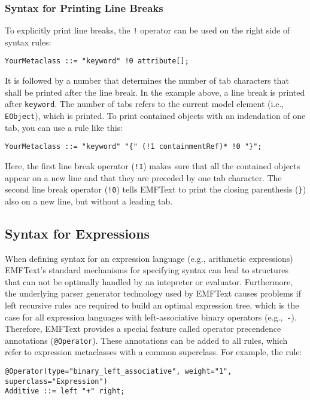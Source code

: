 \subsubsection{Syntax for Printing Line Breaks}

To explicitly print line breaks, the \texttt{!} operator can be used on the
right side of syntax rules:

\begin{lstlisting}
YourMetaclass ::= "keyword" !0 attribute[];
\end{lstlisting}

It is followed by a number that determines the number of tab characters that
shall be printed after the line break. In the example above, a line break
is printed after \texttt{keyword}. The number of tabs refers to the current
model element (i.e., \texttt{EObject}), which is printed. To print contained
objects with an indendation of one tab, you can use a rule like this:

\begin{lstlisting}
YourMetaclass ::= "keyword" "{" (!1 containmentRef)* !0 "}";
\end{lstlisting}

Here, the first line break operator (\texttt{!1}) makes sure that all the
contained objects appear on a new line and that they are preceded by one tab
character. The second line break operator (\texttt{!0}) tells EMFText to print
the closing parenthesis (\texttt{\}}) also on a new line, but without a leading
tab.

\subsection{Syntax for Expressions}
When defining syntax for an expression language (e.g., arithmetic expressions) 
EMFText's standard mechanisms for specifying syntax can lead to structures that 
can not be optimally handled by an intepreter or evaluator. Furthermore, the 
underlying parser generator technology used by EMFText causes problems if 
left recursive rules are required to build an optimal expression tree, which is 
the case for all expression languages with left-associative binary operators 
(e.g.,~\texttt{-}). Therefore, EMFText provides a special feature called
operator precendence annotations (\texttt{@Operator}). These annotations can be added to 
all rules, which refer to expression metaclasses with a common superclass. 
For example, the rule:

\begin{lstlisting}
@Operator(type="binary_left_associative", weight="1", superclass="Expression")
Additive ::= left "+" right;
\end{lstlisting}


